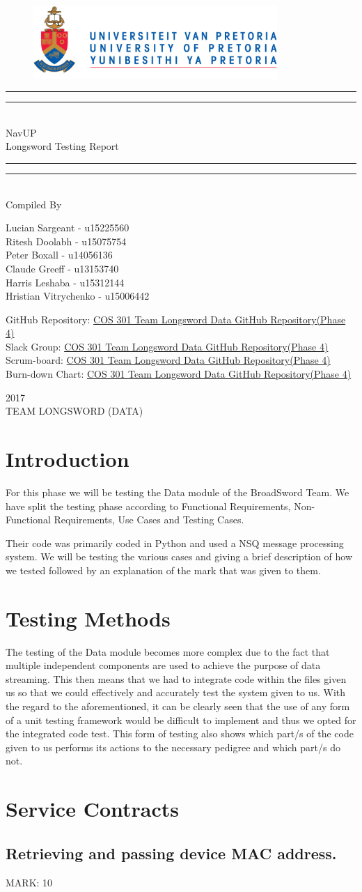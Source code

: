 \documentclass{article}
\newcommand*{\titleGP}{\begingroup
		\begin{figure}[t]
			\centering
			\includegraphics[width=350px]{UP_Logo.PNG}
		\end{figure}
\centering 
\vspace*{\baselineskip}

\rule{\textwidth}{1.6pt}\vspace*{-\baselineskip}\vspace*{2pt}
\rule{\textwidth}{0.4pt}\\[\baselineskip]

{\LARGE NavUP\\ [0.3\baselineskip] Longsword Testing Report } \\ [0.2\baselineskip]
\rule{\textwidth}{0.4pt}\vspace*{-\baselineskip}\vspace{3.2pt}
\rule{\textwidth}{1.6pt}\\[\baselineskip] %



Compiled By \\[\baselineskip]
{\Large Lucian Sargeant - u15225560 \\ Ritesh Doolabh - u15075754 \\ Peter Boxall -  u14056136 \\ Claude Greeff - u13153740\\ Harris Leshaba - u15312144 \\ Hristian Vitrychenko - u15006442\par}

\bigskip
\bigskip

 	GitHub Repository:  
 	\href{https://github.com/Chris19951225/COS-301-Longsword-Data-Streaming}{COS 301 Team Longsword Data GitHub Repository(Phase 4)}
\\
 	Slack Group:  
 	\href{https://github.com/Chris19951225/COS-301-Longsword-Data-Streaming}{COS 301 Team Longsword Data GitHub Repository(Phase 4)}
 	\\
 	Scrum-board:  
 	\href{https://github.com/Chris19951225/COS-301-Longsword-Data-Streaming}{COS 301 Team Longsword Data GitHub Repository(Phase 4)}
 	\\
 	Burn-down Chart:  
 	\href{https://github.com/Chris19951225/COS-301-Longsword-Data-Streaming}{COS 301 Team Longsword Data GitHub Repository(Phase 4)}




 

\vfill


{\scshape 2017} \\[0.3\baselineskip]
{\large TEAM LONGSWORD (DATA)}\par

\endgroup}
\begin{document}
\titleGP
\newpage
\tableofcontents

\newpage

\section{Introduction}
\begin{flushleft}
For this phase we will be testing the Data module of the BroadSword Team. We have split the testing phase according to Functional Requirements, Non-Functional Requirements, Use Cases and Testing Cases. 
\end{flushleft}

\begin{flushleft}
Their code was primarily coded in Python and used a NSQ message processing system.
We will be testing the various cases and giving a brief description of how we tested followed by an explanation of the mark that was given to them.
\end{flushleft}

\section{Testing Methods}
\begin{flushleft}
The testing of the Data module becomes more complex due to the fact that multiple independent components are used to achieve the purpose of data streaming. This then means that we had to integrate code within the files given us so that we could effectively and accurately test the system given to us. With the regard to the aforementioned, it can be clearly seen that the use of any form of a unit testing framework would be difficult to implement and thus we opted for the integrated code test. This form of testing also shows which part/s of the code given to us performs its actions to the necessary pedigree and which part/s do not.
\end{flushleft}

\newpage
\section{Service Contracts}

\subsection{Retrieving and passing device MAC address.}
\begin{flushleft}
MARK: 10
\end{flushleft}
\end{document}
